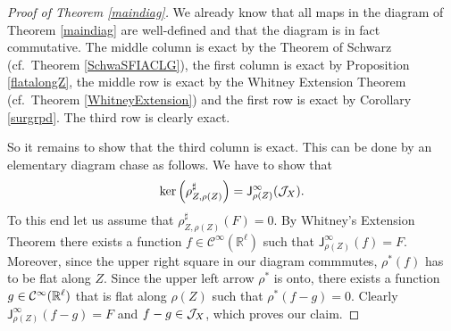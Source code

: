\begin{proof}[Proof of Theorem \ref{maindiag}] We already know that all maps in the diagram of Theorem \ref{maindiag} are well-defined and that the diagram is in fact commutative. The middle column  is exact by the Theorem of Schwarz (cf.~Theorem \ref{SchwaSFIACLG}), the first column is exact by Proposition \ref{flatalongZ}, the middle row is exact by the Whitney Extension Theorem (cf.~Theorem \ref{WhitneyExtension}) and the first row is exact by Corollary \ref{surgrpd}. The third row is clearly exact. 

So it remains to show that the third column is exact. This can be done by an elementary diagram chase as follows. We have to show that \[\operatorname{ker}\left(\rho^{\sharp}_{Z,\rho(Z)}\right)=\mathsf J^\infty_{\rho(Z)}(\mathcal J_X).\]  
To this end let us assume that $\rho^{\sharp}_{Z,\rho(Z)}(F)=0$. By Whitney's Extension Theorem there exists a function $f\in \mathcal C^\infty(\mathbb R^\ell)$ such that $\mathsf J^\infty_{\rho(Z)}(f)=F$. Moreover, since the upper right square in our diagram commmutes, $\rho^*(f)$ has to be flat along $Z$. Since the upper left arrow $\rho^*$ is onto, there exists a function $g\in \mathcal{C}^\infty(\mathbb R^\ell)$ that is flat along $\rho(Z)$ such that $\rho^*(f-g)=0$. Clearly $\mathsf J^\infty_{\rho(Z)}(f-g)=F$ and $f-g\in \mathcal{J}_X$, which proves our claim.
\end{proof}

